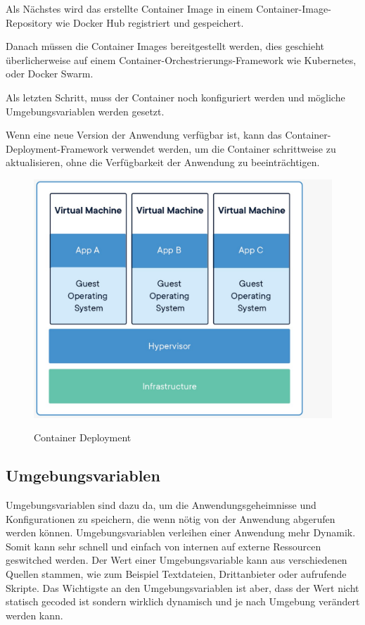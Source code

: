 Als Nächstes wird das erstellte Container Image in einem Container-Image-Repository wie Docker Hub registriert und gespeichert.

Danach müssen die Container Images bereitgestellt werden, dies geschieht überlicherweise auf einem Container-Orchestrierungs-Framework wie Kubernetes, oder Docker Swarm.

Als letzten Schritt, muss der Container noch konfiguriert werden und mögliche Umgebungsvariablen werden gesetzt.

Wenn eine neue Version der Anwendung verfügbar ist, kann das Container-Deployment-Framework verwendet werden, um die Container schrittweise zu aktualisieren, ohne die Verfügbarkeit der Anwendung zu beeinträchtigen.


\begin{figure}[h!]
    \centering
    \includegraphics[width=0.6\linewidth]{pics/container_deployment.jpeg}
    \caption{Container Deployment}
    \label{fig:enter-label}
    \cite{container_grafik}
\end{figure}

\subsection{Umgebungsvariablen}

Umgebungsvariablen sind dazu da, um die Anwendungsgeheimnisse und Konfigurationen zu speichern, die wenn nötig von der Anwendung abgerufen werden können. Umgebungsvariablen verleihen einer Anwendung mehr Dynamik. Somit kann sehr schnell und einfach von internen auf externe Ressourcen geswitched werden. Der Wert einer Umgebungsvariable kann aus verschiedenen Quellen stammen, wie zum Beispiel Textdateien, Drittanbieter oder aufrufende Skripte. Das Wichtigste an den Umgebungsvariablen ist aber, dass der Wert nicht statisch gecoded ist sondern wirklich dynamisch und je nach Umgebung verändert werden kann.

